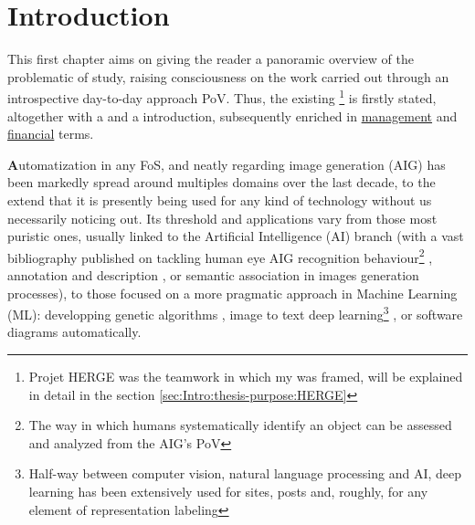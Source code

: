 \chapter[Introduction]{Introduction}
\label{cap:Intro}

\begin{Resumen}

This first chapter aims on giving the reader a panoramic overview of the problematic of study, raising consciousness on the work carried out through an introspective day-to-day approach PoV. Thus, the existing \footnote{Projet HERGE was the teamwork in which my  was framed, will be explained in detail in the section \ref{sec:Intro:thesis-purpose:HERGE}} is firstly stated, altogether with a  and a  introduction, subsequently enriched in \hyperref[sec:Intro:Thesis-purpose:Outcomes]{management} and \hyperref[sec:Intro:Thesis-purpose-Budget]{financial} terms.

\end{Resumen}
\PartialToc

\bigskip
\lettrine[lines=2]{\textbf{A}}{}utomatization in any FoS, and neatly regarding image generation (AIG) has been markedly spread around multiples domains over the last decade, to the extend that it is presently being used for any kind of technology without us necessarily noticing out. Its threshold and applications vary from those most puristic ones, usually linked to the Artificial Intelligence (AI) branch (with a vast bibliography published on tackling human eye AIG recognition behaviour\footnote{The way in which humans systematically identify an object can be assessed and analyzed from the AIG's PoV} \cite{Eyevision}, annotation and description \cite{Automaticimageannotation,Automaticdescgeneration}, or semantic association \cite{Naturallanguage} in images generation processes), to those focused on a more pragmatic approach in Machine Learning (ML): developping genetic algorithms \cite{Genetic_algorithms}, image to text deep learning\footnote{Half-way between computer vision, natural language processing and AI, deep learning has been extensively used for sites, posts and, roughly, for any element of representation labeling} \cite{Deep_learning_image_to_text}, or software diagrams \cite{Software_diagrams} automatically.

